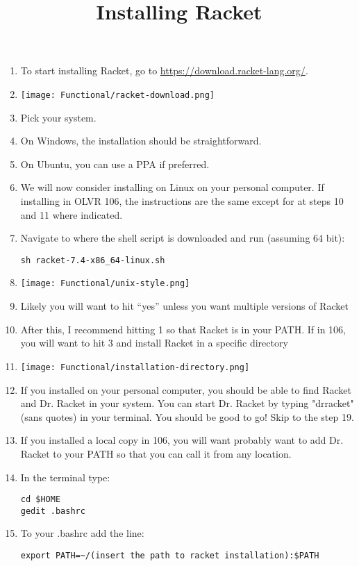 \documentclass{article}
\title{Installing Racket}
\begin{document}
\maketitle

\begin{enumerate}
\item To start installing Racket, go to \url{https://download.racket-lang.org/}.
\item \texttt{[image: Functional/racket-download.png]}
\item Pick your system.
\item On Windows, the installation should be straightforward. 
\item On Ubuntu, you can use a PPA if preferred.
\item We will now consider installing on Linux on your personal computer. If installing in OLVR 106, the instructions are the same except for at steps 10
  and 11 where indicated.
\item Navigate to where the shell script is downloaded and run (assuming 64 bit): \begin{verbatim}
sh racket-7.4-x86_64-linux.sh
\end{verbatim}
\item \texttt{[image: Functional/unix-style.png]}
\item Likely you will want to hit ``yes'' unless you want multiple versions of Racket
\item After this, I recommend hitting 1 so that Racket is in your PATH.
If in 106, you will want to hit 3 and install Racket in a specific
directory
\item \texttt{[image: Functional/installation-directory.png]}
\item If you installed on your personal computer, you should be able
to find Racket and Dr. Racket in your system. You can start Dr. Racket by typing "drracket" (sans quotes) in your terminal. You should be good to go! Skip to the  step 19.
\item If you installed a local copy in 106, you will want probably want to add Dr. Racket to your PATH so that you can call it from any location.
\item In the terminal type:
\begin{verbatim}
cd $HOME
gedit .bashrc
\end{verbatim}
\item To your .bashrc add the line:
\begin{verbatim}
export PATH=~/(insert the path to racket installation):$PATH

\end{verbatim}
\end{enumerate}
\end{document}
